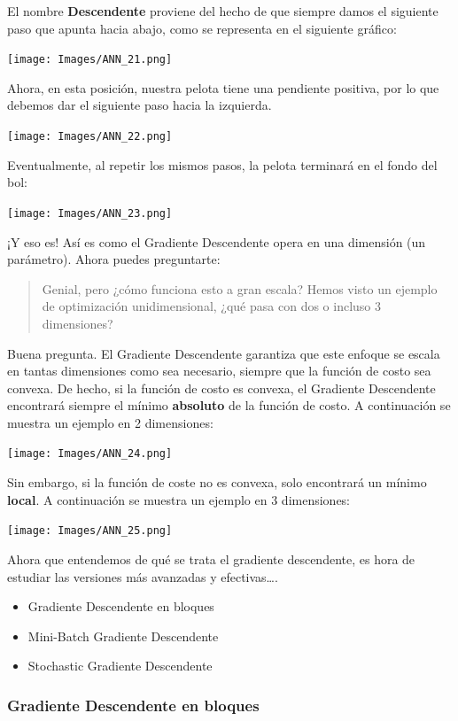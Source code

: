\documentclass[
]{book}
\providecommand{\tightlist}{%
  \setlength{\itemsep}{0pt}\setlength{\parskip}{0pt}}
\begin{document}
El nombre \textbf{Descendente} proviene del hecho de que siempre damos el siguiente paso que apunta hacia abajo, como se representa en el siguiente gráfico:

\texttt{[image: Images/ANN\_21.png]}

Ahora, en esta posición, nuestra pelota tiene una pendiente positiva, por lo que debemos dar el siguiente paso hacia la izquierda.

\texttt{[image: Images/ANN\_22.png]}

Eventualmente, al repetir los mismos pasos, la pelota terminará en el fondo del bol:

\texttt{[image: Images/ANN\_23.png]}

¡Y eso es! Así es como el Gradiente Descendente opera en una dimensión (un parámetro). Ahora puedes preguntarte:

\begin{quote}
Genial, pero ¿cómo funciona esto a gran escala? Hemos visto un ejemplo de optimización unidimensional, ¿qué pasa con dos o incluso 3 dimensiones?
\end{quote}

Buena pregunta. El Gradiente Descendente garantiza que este enfoque se escala en tantas dimensiones como sea necesario, siempre que la función de costo sea convexa. De hecho, si la función de costo es convexa, el Gradiente Descendente encontrará siempre el mínimo \textbf{absoluto} de la función de costo. A continuación se muestra un ejemplo en 2 dimensiones:

\texttt{[image: Images/ANN\_24.png]}

Sin embargo, si la función de coste no es convexa, solo encontrará un mínimo \textbf{local}. A continuación se muestra un ejemplo en 3 dimensiones:

\texttt{[image: Images/ANN\_25.png]}

Ahora que entendemos de qué se trata el gradiente descendente, es hora de estudiar las versiones más avanzadas y efectivas\ldots.

\begin{itemize}
\tightlist
\item
  Gradiente Descendente en bloques
\item
  Mini-Batch Gradiente Descendente
\item
  Stochastic Gradiente Descendente
\end{itemize}

\hypertarget{gradiente-descendente-en-bloques}{%
\subsubsection{Gradiente Descendente en bloques}\label{gradiente-descendente-en-bloques}}
\end{document}
